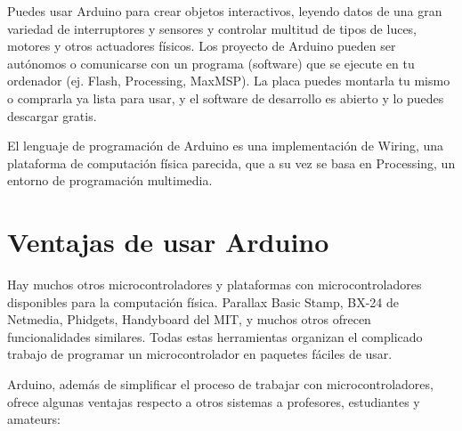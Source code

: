 \documentclass[12pt,a4paper]{report}
\begin{document}
Puedes usar Arduino para crear objetos interactivos, leyendo datos de una gran variedad de interruptores y sensores y controlar multitud de tipos de luces, motores y otros actuadores físicos. Los proyecto de Arduino pueden ser autónomos o comunicarse con un programa (software) que se ejecute en tu ordenador (ej. Flash, Processing, MaxMSP). La placa puedes montarla tu mismo o comprarla ya lista para usar, y el software de desarrollo es abierto y lo puedes descargar gratis.

El lenguaje de programación de Arduino es una implementación de Wiring, una plataforma de computación física parecida, que a su vez se basa en Processing, un entorno de programación multimedia.


\section{Ventajas de usar Arduino}

Hay muchos otros microcontroladores y plataformas con microcontroladores disponibles para la computación física. Parallax Basic Stamp, BX-24 de Netmedia, Phidgets, Handyboard del MIT, y muchos otros ofrecen funcionalidades similares. Todas estas herramientas organizan el complicado trabajo de programar un microcontrolador en paquetes fáciles de usar.

Arduino, además de simplificar el proceso de trabajar con microcontroladores, ofrece algunas ventajas respecto a otros sistemas a profesores, estudiantes y amateurs:
\end{document}
